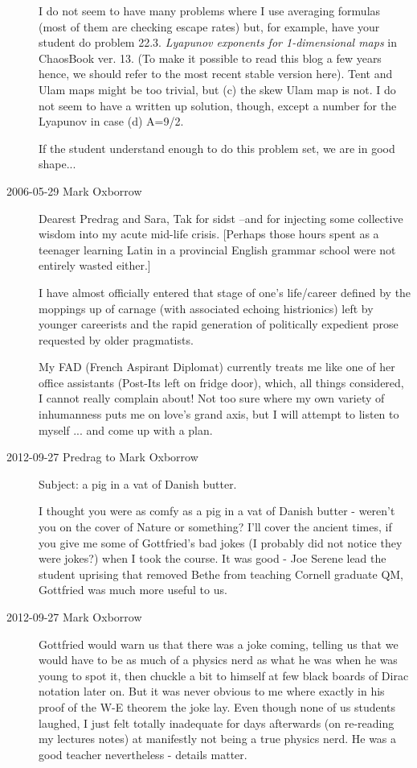 \begin{description}
I do not seem to have many problems where I use averaging formulas (most
of them are checking escape rates) but, for example, have your student do
problem 22.3. \emph{Lyapunov exponents for 1-dimensional maps} in
 {ChaosBook
ver. 13}. (To make it possible to read this blog a few years hence, we
should refer to the most recent stable version here). Tent and Ulam maps
might be too trivial, but (c) the skew Ulam map is not. I do not seem to
have a written up solution, though, except a number for the Lyapunov in
case (d) A=9/2.

If the student understand enough to do this problem set, we are in good
shape...


\item[2006-05-29 Mark Oxborrow]
Dearest Predrag and Sara, Tak for sidst --and for injecting some
collective wisdom into my acute mid-life crisis. [Perhaps those hours
spent as a teenager learning Latin in a provincial English grammar school
were not entirely wasted either.]

I have almost officially entered that stage of one's life/career defined
by the moppings up of carnage (with associated echoing histrionics) left
by younger careerists and the rapid generation of politically expedient
prose requested by older pragmatists.

My FAD (French Aspirant Diplomat) currently treats me like one of her
office assistants (Post-Its left on fridge door), which, all things
considered, I cannot really complain about!
Not too sure where my own variety of
inhumanness puts me on love's grand axis, but I will attempt to listen to
myself ... and come up with a plan.

\item[2012-09-27 Predrag
to Mark Oxborrow]
Subject: a pig in a vat of Danish butter.

I thought you were as comfy as a pig in a vat of Danish butter - weren't
you on the cover of Nature or something? I'll cover the ancient times,
if you give me some of Gottfried's bad jokes (I probably did not notice
they were jokes?) when I took the course. It was good - Joe Serene lead
the student uprising that removed Bethe from teaching Cornell graduate QM,
Gottfried was much more useful to us.

\item[2012-09-27 Mark Oxborrow]
Gottfried would warn us that there was a joke coming, telling us that we
would have to be as much of a physics nerd as what he was when he was
young to spot it, then chuckle a bit to himself at few black boards of
Dirac notation later on. But it was never obvious to me where exactly in
his proof of the W-E theorem the joke lay. Even though none of us
students laughed, I just felt totally inadequate for days afterwards (on
re-reading my lectures notes) at manifestly not being a true physics
nerd. He was a good teacher nevertheless - details matter.


\end{description}
